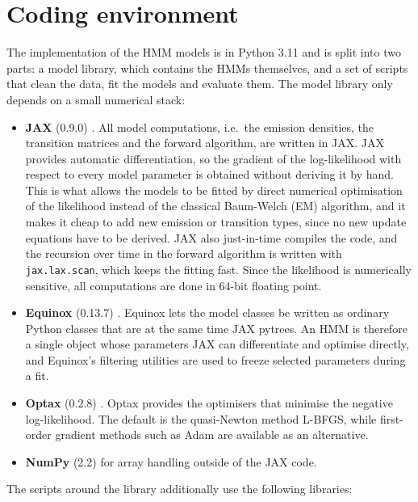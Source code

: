 \section{Coding environment}
The implementation of the HMM models is in Python 3.11 and is split into two
parts: a model library, which contains the HMMs themselves, and a set of
scripts that clean the data, fit the models and evaluate them. The model
library only depends on a small numerical stack:
\begin{itemize}
    \item \textbf{JAX} (0.9.0) \parencite{jax2018}. All model computations,
    i.e.\ the emission densities, the transition matrices and the forward
    algorithm, are written in JAX. JAX provides automatic differentiation, so
    the gradient of the log-likelihood with respect to every model parameter is
    obtained without deriving it by hand. This is what allows the models to be
    fitted by direct numerical optimisation of the likelihood instead of the
    classical Baum-Welch (EM) algorithm, and it makes it cheap to add new
    emission or transition types, since no new update equations have to be
    derived. JAX also just-in-time compiles the code, and the recursion over
    time in the forward algorithm is written with \texttt{jax.lax.scan}, which
    keeps the fitting fast. Since the likelihood is numerically sensitive, all
    computations are done in 64-bit floating point.
    \item \textbf{Equinox} (0.13.7) \parencite{kidger2021equinox}. Equinox lets
    the model classes be written as ordinary Python classes that are at the same
    time JAX pytrees. An HMM is therefore a single object whose parameters JAX
    can differentiate and optimise directly, and Equinox's filtering utilities
    are used to freeze selected parameters during a fit.
    \item \textbf{Optax} (0.2.8) \parencite{deepmind2020jax}. Optax provides the
    optimisers that minimise the negative log-likelihood. The default is the
    quasi-Newton method L-BFGS, while first-order gradient methods such as Adam
    are available as an alternative.
    \item \textbf{NumPy} (2.2) \parencite{harris2020numpy} for array handling
    outside of the JAX code.
\end{itemize}
The scripts around the library additionally use the following libraries:
